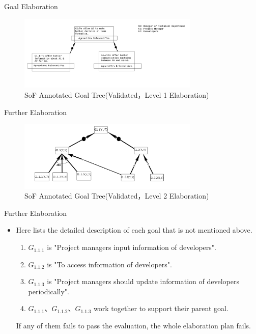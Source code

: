\documentclass{beamer}
\begin{document}
\begin{frame}  {Goal Elaboration}
  \begin{figure}
    \includegraphics[width=3.4in]{img/4.PNG}
    \caption{SoF Annotated Goal Tree(Validated，Level 1 Elaboration)}
  \end{figure}
\end{frame}

\begin{frame} {Further Elaboration}
  \begin{figure}
    \includegraphics[width=3.4in]{img/5.PNG}
    \caption{SoF Annotated Goal Tree(Validated，Level 2 Elaboration)}
  \end{figure}
\end{frame}   

\begin{frame}  {Further Elaboration}   %
  \begin{itemize}
  \item
    Here lists the detailed description of each goal that is not mentioned above.
    \begin{enumerate}
    \item $G_{1.1.1}$ is "Project managers input information of developers". 
    \item $G_{1.1.2}$ is "To access information of developers". 
    \item $G_{1.1.3}$ is "Project managers should update information of developers periodically". 
    \item $G_{1.1.1}$、$G_{1.1.2}$、$G_{1.1.3}$ work together to support their parent goal.
    \end{enumerate}
    If any of them fails to pass the evaluation, the whole elaboration plan fails.
  \end{itemize}
\end{frame}
\end{document}
